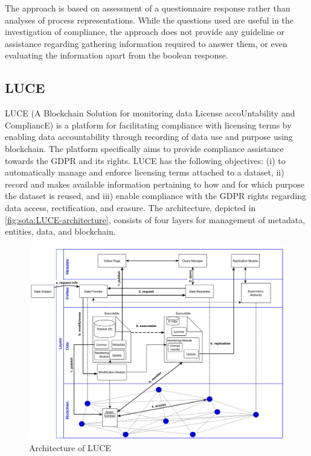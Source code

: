 The approach is based on assessment of a questionnaire response rather than analyses of process representations. While the questions used are useful in the investigation of compliance, the approach does not provide any guideline or assistance regarding gathering information required to answer them, or even evaluating the information apart from the boolean response.

\subsection*{LUCE}
LUCE \cite{havelange_luce_2019} (A Blockchain Solution for monitoring data License accoUntability and CompliancE) is a platform for facilitating compliance with licensing terms by enabling data accountability through recording of data use and purpose using blockchain. The platform specifically aims to provide compliance assistance towards the GDPR and its rights. LUCE has the following objectives: (i) to automatically manage and enforce licensing terms attached to a dataset, ii) record and makes available information pertaining to how and for which purpose the dataset is reused, and iii) enable compliance with the GDPR rights regarding data access, rectification, and erasure. The architecture, depicted in \autoref{fig:sota:LUCE-architecture}, consists of four layers for management of metadata, entities, data, and blockchain. 
\begin{figure}[htbp]
    \centering
    \includegraphics[width=0.8\linewidth]{img/LUCE_architecture.png}
    \caption{Architecture of LUCE \cite{havelange_luce_2019}}
    \label{fig:sota:LUCE-architecture}
\end{figure}

